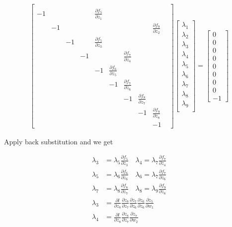 \documentclass[12pt,crop=false,class=article,convert={density=300,outext=.compiled.png}]{standalone}
\begin{document}
 \begin{align*}
\begin{bmatrix}
\\-1 &   &   &   & \frac{\partial f_{5}}{\partial z_{1}} &   &   &   &   
\\   &-1 &   &   &   &   &   &   & \frac{\partial f_{9}}{\partial z_{2}} 
\\   &   &-1 &   & \frac{\partial f_{5}}{\partial z_{3}} &   &   &   &   
\\   &   &   &-1 &   &   & \frac{\partial f_{7}}{\partial z_{4}} &   &   
\\   &   &   &   &-1 & \frac{\partial f_{6}}{\partial z_{5}} &   &   &   
\\   &   &   &   &   &-1 & \frac{\partial f_{7}}{\partial z_{6}} &   &   
\\   &   &   &   &   &   &-1 & \frac{\partial f_{8}}{\partial z_{7}} &   
\\   &   &   &   &   &   &   &-1 & \frac{\partial f_{9}}{\partial z_{8}} 
\\   &   &   &   &   &   &   &   & -1 & 
\end{bmatrix}
\begin{bmatrix}
\lambda_{1}\\
\lambda_{2}\\
\lambda_{3}\\
\lambda_{4}\\
\lambda_{5}\\
\lambda_{6}\\
\lambda_{7}\\
\lambda_{8}\\
\lambda_{9}\\
\end{bmatrix}
=
\begin{bmatrix}
0\\
0\\
0\\
0\\
0\\
0\\
0\\
0\\
-1
\end{bmatrix}
\end{align*} 

Apply back substitution and we get

\begin{align*}
\lambda_3 &= \lambda_5 \frac{\partial f_5}{\partial z_3}\quad
\lambda_4 = \lambda_7 \frac{\partial f_7}{\partial z_4}\\
\lambda_5 &= \lambda_6 \frac{\partial f_6}{\partial z_6}\quad
\lambda_6 = \lambda_7 \frac{\partial f_7}{\partial z_6}\\
\lambda_7 &= \lambda_8 \frac{\partial f_8}{\partial z_7}\quad
\lambda_8 = \lambda_9 \frac{\partial f_9}{\partial z_8}\\
\lambda_3 &= \frac{\partial l}{\partial z_8} \frac{\partial z_8}{\partial z_7} \frac{\partial z_7}{\partial z_6} \frac{\partial z_6}{\partial z_6} \frac{\partial z_5}{\partial w_1}\\
\lambda_4 &= \frac{\partial l}{\partial z_8} \frac{\partial z_8}{\partial z_7} \frac{\partial z_7}{\partial w_2}
\end{align*}
\end{document}
